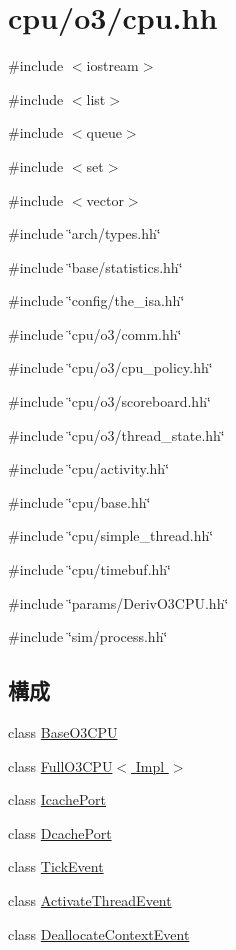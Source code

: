 \hypertarget{o3_2cpu_8hh}{
\section{cpu/o3/cpu.hh}
\label{o3_2cpu_8hh}
}
{\ttfamily \#include $<$iostream$>$}\par
{\ttfamily \#include $<$list$>$}\par
{\ttfamily \#include $<$queue$>$}\par
{\ttfamily \#include $<$set$>$}\par
{\ttfamily \#include $<$vector$>$}\par
{\ttfamily \#include \char`\"{}arch/types.hh\char`\"{}}\par
{\ttfamily \#include \char`\"{}base/statistics.hh\char`\"{}}\par
{\ttfamily \#include \char`\"{}config/the\_\-isa.hh\char`\"{}}\par
{\ttfamily \#include \char`\"{}cpu/o3/comm.hh\char`\"{}}\par
{\ttfamily \#include \char`\"{}cpu/o3/cpu\_\-policy.hh\char`\"{}}\par
{\ttfamily \#include \char`\"{}cpu/o3/scoreboard.hh\char`\"{}}\par
{\ttfamily \#include \char`\"{}cpu/o3/thread\_\-state.hh\char`\"{}}\par
{\ttfamily \#include \char`\"{}cpu/activity.hh\char`\"{}}\par
{\ttfamily \#include \char`\"{}cpu/base.hh\char`\"{}}\par
{\ttfamily \#include \char`\"{}cpu/simple\_\-thread.hh\char`\"{}}\par
{\ttfamily \#include \char`\"{}cpu/timebuf.hh\char`\"{}}\par
{\ttfamily \#include \char`\"{}params/DerivO3CPU.hh\char`\"{}}\par
{\ttfamily \#include \char`\"{}sim/process.hh\char`\"{}}\par
\subsection*{構成}
\begin{DoxyCompactItemize}
\item 
class \hyperlink{classBaseO3CPU}{BaseO3CPU}
\item 
class \hyperlink{classFullO3CPU}{FullO3CPU$<$ Impl $>$}
\item 
class \hyperlink{classFullO3CPU_1_1IcachePort}{IcachePort}
\item 
class \hyperlink{classFullO3CPU_1_1DcachePort}{DcachePort}
\item 
class \hyperlink{classFullO3CPU_1_1TickEvent}{TickEvent}
\item 
class \hyperlink{classFullO3CPU_1_1ActivateThreadEvent}{ActivateThreadEvent}
\item 
class \hyperlink{classFullO3CPU_1_1DeallocateContextEvent}{DeallocateContextEvent}
\end{DoxyCompactItemize}

